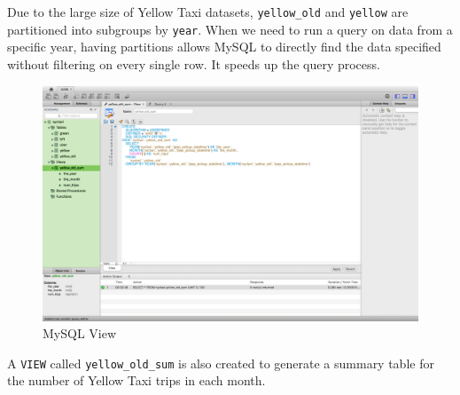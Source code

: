 \documentclass[12pt,twoside]{reedthesis}
\theoremstyle{definition}
\theoremstyle{definition}
\theoremstyle{definition}
\theoremstyle{remark}
\begin{document}
Due to the large size of Yellow Taxi datasets, \texttt{yellow\_old} and
\texttt{yellow} are partitioned into subgroups by \texttt{year}. When we
need to run a query on data from a specific year, having partitions
allows MySQL to directly find the data specified without filtering on
every single row. It speeds up the query process.
\begin{figure}[h]

{\centering \includegraphics[width=5.76in]{figure/mysql_view} 

}

\caption{MySQL View}\label{fig:mysql-view}
\end{figure}
A \texttt{VIEW} called \texttt{yellow\_old\_sum} is also created to
generate a summary table for the number of Yellow Taxi trips in each
month.
\end{document}
